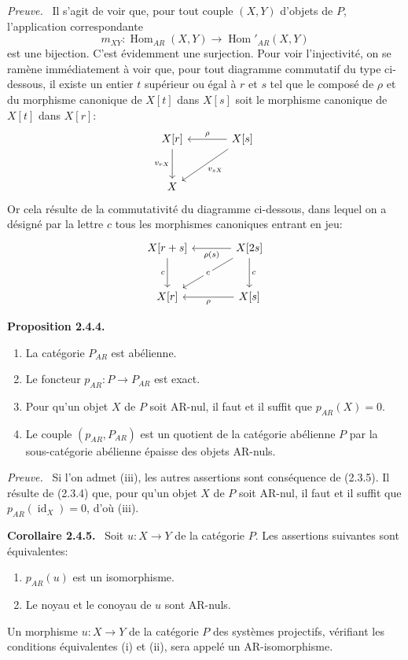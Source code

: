 \documentclass[11pt]{article}
\newenvironment{statement}[1]{\par\medskip\noindent\textbf{#1.}\ }{\par\medskip}
\newenvironment{prooftext}[1][Proof]{\par\noindent\emph{#1.}\ }{\par\medskip}
\DeclareMathOperator{\Hom}{Hom}
\providecommand{\id}{\operatorname{id}}
\providecommand{\Hom}{\operatorname{Hom}}
\providecommand{\id}{\operatorname{id}}
\providecommand{\id}{\operatorname{id}}
\providecommand{\id}{\operatorname{id}}
\providecommand{\id}{\operatorname{id}}
\providecommand{\Hom}{\operatorname{Hom}}
\providecommand{\id}{\operatorname{id}}
\begin{document}
\begin{prooftext}[Preuve]
Il s'agit de voir que, pour tout couple $(X,Y)$ d'objets de $P$, l'application correspondante
\[
m_{XY}:\Hom_{AR}(X,Y)\longrightarrow\Hom'_{AR}(X,Y)
\]
est une bijection. C'est évidemment une surjection. Pour voir l'injectivité, on se ramène immédiatement à voir que, pour tout diagramme commutatif du type ci-dessous, il existe un entier $t$ supérieur ou égal à $r$ et $s$ tel que le composé de $\rho$ et du morphisme canonique de $X[t]$ dans $X[s]$ soit le morphisme canonique de $X[t]$ dans $X[r]$:
\[
\begin{tikzcd}[column sep=large,row sep=large]
X[r] \arrow[d,"{v_{rX}}"'] & X[s] \arrow[l,"\rho"'] \arrow[dl,"{v_{sX}}"]\\
X & {}
\end{tikzcd}
\]
Or cela résulte de la commutativité du diagramme ci-dessous, dans lequel on a désigné par la lettre $c$ tous les morphismes canoniques entrant en jeu:
\[
\begin{tikzcd}[column sep=large,row sep=large]
X[r+s] \arrow[d,"c"'] & X[2s] \arrow[l,"\rho(s)"] \arrow[d,"c"] \arrow[dl,"c" description]\\
X[r] & X[s] \arrow[l,"\rho"]
\end{tikzcd}
\]
\end{prooftext}

\begin{statement}{Proposition 2.4.4}
\begin{enumerate}[label=(\roman*)]
\item La catégorie $P_{AR}$ est abélienne.
\item Le foncteur $p_{AR}:P\to P_{AR}$ est exact.
\item Pour qu'un objet $X$ de $P$ soit AR-nul, il faut et il suffit que $p_{AR}(X)=0$.
\item Le couple $(p_{AR},P_{AR})$ est un quotient de la catégorie abélienne $P$ par la sous-catégorie abélienne épaisse des objets AR-nuls.
\end{enumerate}
\end{statement}

\begin{prooftext}[Preuve]
Si l'on admet (iii), les autres assertions sont conséquence de (2.3.5). Il résulte de (2.3.4) que, pour qu'un objet $X$ de $P$ soit AR-nul, il faut et il suffit que $p_{AR}(\id_X)=0$, d'où (iii).
\end{prooftext}

\begin{statement}{Corollaire 2.4.5}
Soit $u:X\to Y$ de la catégorie $P$. Les assertions suivantes sont équivalentes:
\begin{enumerate}[label=(\roman*)]
\item $p_{AR}(u)$ est un isomorphisme.
\item Le noyau et le conoyau de $u$ sont AR-nuls.
\end{enumerate}
Un morphisme $u:X\to Y$ de la catégorie $P$ des systèmes projectifs, vérifiant les conditions équivalentes (i) et (ii), sera appelé un AR-isomorphisme.
\end{statement}
\end{document}
